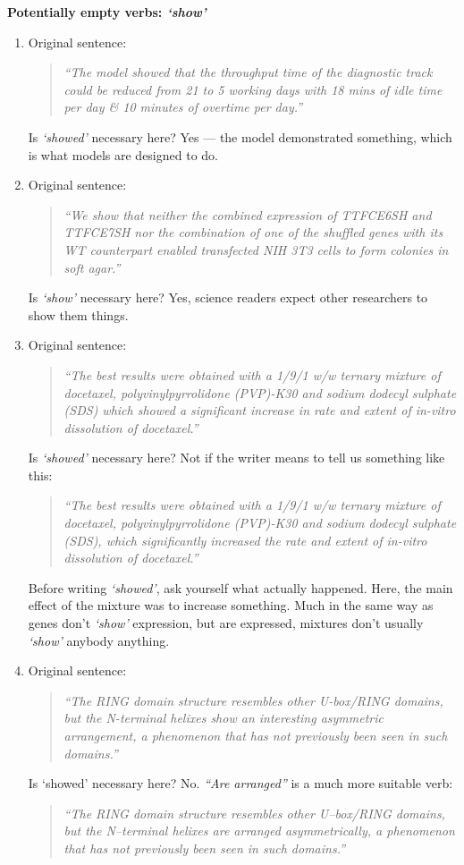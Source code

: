 \documentclass[graybox,envcountchap,sectrefs,UStrade]{svmono}
\begin{document}
\begin{flushleft}
\textbf{Potentially empty verbs: \emph{`show'}}
\end{flushleft}

\begin{enumerate}
  \item Original sentence:
  \begin{quote}
    \emph{``The model showed that the throughput time of the diagnostic track could be reduced from 21 to 5 working days with 18 mins of idle time per day \& 10 minutes of overtime per day.''}
  \end{quote}
  Is \emph{`showed'} necessary here? Yes --- the model demonstrated something, which is what models are designed to do.
  \smallskip
  \item Original sentence:
  \begin{quote}
    \emph{``We show that neither the combined expression of TTFCE6SH and TTFCE7SH nor the combination of one of the shuffled genes with its WT counterpart enabled transfected NIH 3T3 cells to form colonies in soft agar.''}
  \end{quote}
  Is \emph{`show'} necessary here? Yes, science readers expect other researchers to show them things.
  \smallskip
  \item Original sentence:
  \begin{quote}
    \emph{``The best results were obtained with a 1/9/1 w/w ternary mixture of docetaxel, polyvinylpyrrolidone (PVP)-K30 and sodium dodecyl sulphate (SDS) which showed a significant increase in rate and extent of in-vitro dissolution of docetaxel.''}
  \end{quote}
  Is \emph{`showed'} necessary here? Not if the writer means to tell us something like this:
  \begin{quote}
    \emph{``The best results were obtained with a 1/9/1 w/w ternary mixture of docetaxel, polyvinylpyrrolidone (PVP)-K30 and sodium dodecyl sulphate (SDS), which significantly increased the rate and extent of in-vitro dissolution of docetaxel.''}
  \end{quote}
  Before writing \emph{`showed'}, ask yourself what actually happened. Here, the main effect of the mixture was to increase something. Much in the same way as genes don't \emph{`show'} expression, but are expressed, mixtures don't usually \emph{`show'} anybody anything.
  \smallskip
 \item Original sentence:
  \begin{quote}
    \emph{``The RING domain structure resembles other U-box/RING domains, but the N-terminal helixes show an interesting asymmetric arrangement, a phenomenon that has not previously been seen in such domains.''}
  \end{quote}
    Is `showed' necessary here? No. \emph{``Are arranged''} is a much more suitable verb:
  \begin{quote}
    \emph{``The RING domain structure resembles other U--box/RING domains, but the N--terminal helixes are arranged asymmetrically, a phenomenon that has not previously been seen in such domains.''}
  \end{quote}
\end{enumerate}
\end{document}
